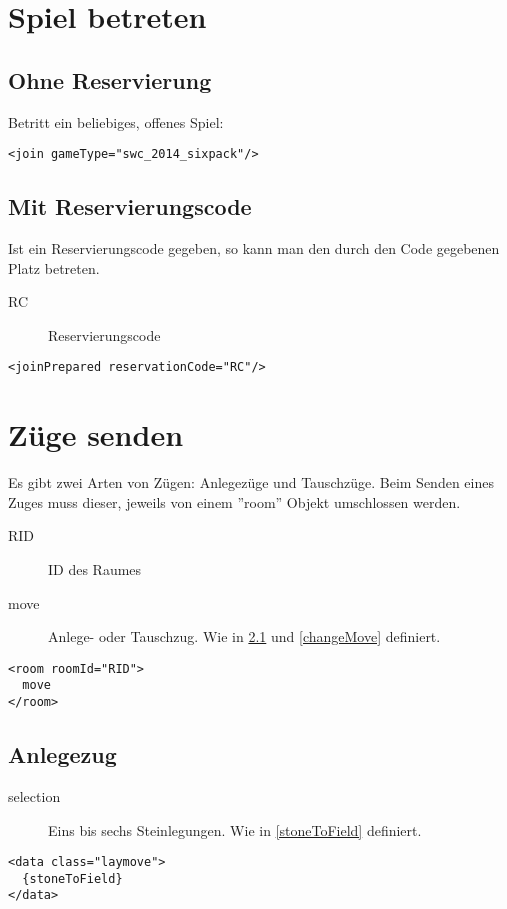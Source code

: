 \documentclass[12pt,a4paper, ngerman, oneside]{scrartcl}
\begin{document}
\section{Spiel betreten}
\subsection{Ohne Reservierung}
Betritt ein beliebiges, offenes Spiel:
\begin{verbatim}
<join gameType="swc_2014_sixpack"/>
\end{verbatim}
\subsection{Mit Reservierungscode}
Ist ein Reservierungscode gegeben, so kann man den durch den Code gegebenen Platz betreten.
\begin{description}
\item[RC] Reservierungscode
\end{description}
\begin{verbatim}
<joinPrepared reservationCode="RC"/>
\end{verbatim}

\section{Züge senden}
Es gibt zwei Arten von Zügen: Anlegezüge und Tauschzüge. Beim Senden eines Zuges muss dieser, jeweils von einem ''room'' Objekt umschlossen werden.
\begin{description}
\item[RID] ID des Raumes
\item[move] Anlege- oder Tauschzug. Wie in \ref{layMove} und \ref{changeMove} definiert.
\end{description}
\begin{verbatim}
<room roomId="RID">
  move
</room>
\end{verbatim}
\subsection{Anlegezug}
\label{layMove}
\begin{description}
\item[selection] Eins bis sechs Steinlegungen. Wie in \ref{stoneToField} definiert.
\end{description}
\begin{verbatim}
<data class="laymove">
  {stoneToField}
</data>
\end{verbatim}
\end{document}
